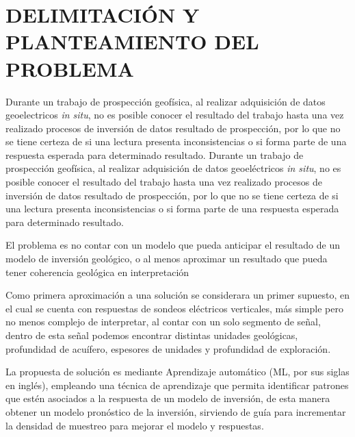 \chapter{DELIMITACIÓN Y PLANTEAMIENTO DEL PROBLEMA}
Durante un trabajo de prospección geofísica, al realizar adquisición de datos geoelectricos \textit{in situ}, no es posible conocer el resultado del trabajo hasta una vez realizado procesos de inversión de datos resultado de prospección, por lo que no se tiene certeza de si una lectura presenta inconsistencias o si forma parte de una respuesta esperada para determinado resultado.
Durante un trabajo de prospección geofísica, al realizar adquisición de datos geoeléctricos \textit{in situ}, no es posible conocer el resultado del trabajo hasta una vez realizado procesos de inversión de datos resultado de prospección, por lo que no se tiene certeza de si una lectura presenta inconsistencias o si forma parte de una respuesta esperada para determinado resultado.

El problema es no contar con un modelo que pueda anticipar el resultado de un modelo de inversión geológico, o al menos aproximar un resultado que pueda tener coherencia geológica en interpretación

Como primera aproximación a una solución se considerara un primer supuesto, en el cual se cuenta con respuestas de sondeos eléctricos verticales, más simple pero no menos complejo de interpretar, al contar con un solo segmento de señal, dentro de esta señal podemos encontrar distintas unidades geológicas, profundidad de acuífero, espesores de unidades y profundidad de exploración.

La propuesta de solución es mediante Aprendizaje automático (ML, por sus siglas en inglés), empleando una técnica de aprendizaje que permita identificar patrones que estén asociados a la respuesta de un modelo de inversión, de esta manera obtener un modelo pronóstico de la inversión, sirviendo de guía para incrementar la densidad de muestreo para mejorar el modelo y respuestas.  
